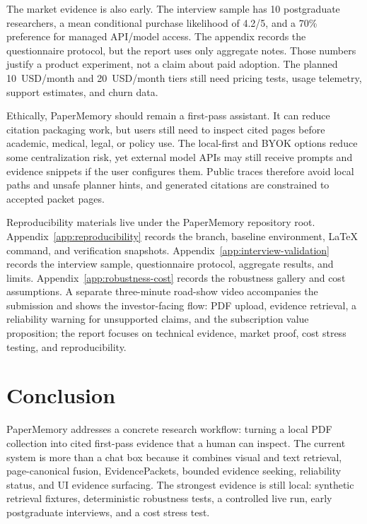 \documentclass{article}
\begin{document}
The market evidence is also early. The interview sample has 10 postgraduate researchers, a mean conditional purchase likelihood of 4.2/5, and a 70\% preference for managed API/model access. The appendix records the questionnaire protocol, but the report uses only aggregate notes. Those numbers justify a product experiment, not a claim about paid adoption. The planned 10~USD/month and 20~USD/month tiers still need pricing tests, usage telemetry, support estimates, and churn data.

Ethically, PaperMemory should remain a first-pass assistant. It can reduce citation packaging work, but users still need to inspect cited pages before academic, medical, legal, or policy use. The local-first and BYOK options reduce some centralization risk, yet external model APIs may still receive prompts and evidence snippets if the user configures them. Public traces therefore avoid local paths and unsafe planner hints, and generated citations are constrained to accepted packet pages.

Reproducibility materials live under the PaperMemory repository root. Appendix~\ref{app:reproducibility} records the branch, baseline environment, LaTeX command, and verification snapshots. Appendix~\ref{app:interview-validation} records the interview sample, questionnaire protocol, aggregate results, and limits. Appendix~\ref{app:robustness-cost} records the robustness gallery and cost assumptions. A separate three-minute road-show video accompanies the submission and shows the investor-facing flow: PDF upload, evidence retrieval, a reliability warning for unsupported claims, and the subscription value proposition; the report focuses on technical evidence, market proof, cost stress testing, and reproducibility.

\section{Conclusion}
\label{sec:conclusion}

PaperMemory addresses a concrete research workflow: turning a local PDF collection into cited first-pass evidence that a human can inspect. The current system is more than a chat box because it combines visual and text retrieval, page-canonical fusion, EvidencePackets, bounded evidence seeking, reliability status, and UI evidence surfacing. The strongest evidence is still local: synthetic retrieval fixtures, deterministic robustness tests, a controlled live run, early postgraduate interviews, and a cost stress test.
\end{document}
